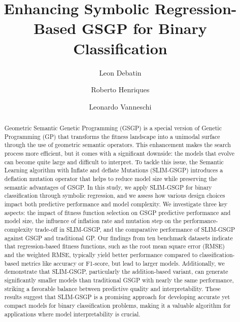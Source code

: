 \documentclass[manuscript, review, anonymous]{acmart} %
\begin{document}
\title{Enhancing Symbolic Regression-Based GSGP for Binary Classification}

\author{Leon Debatin}

\author{Roberto Henriques}

\author{Leonardo Vanneschi}

\renewcommand{\shortauthors}{Debatin et al.}

\begin{abstract}
Geometric Semantic Genetic Programming (GSGP) is a 
special version of Genetic Programming (GP) that transforms 
the fitness landscape into a unimodal surface through 
the use of geometric semantic operators. 
This enhancement makes the search process more efficient, 
but it comes with a significant downside: the models that evolve can become quite large and difficult to interpret. 
To tackle this issue, the Semantic Learning algorithm with Inﬂate and deﬂate Mutations (SLIM-GSGP) introduces 
a deflation mutation operator that helps to reduce model size 
while preserving the semantic advantages of GSGP. 
In this study, we apply SLIM-GSGP for binary classification through symbolic regression, and we assess how various design 
choices impact both predictive performance and model complexity. We investigate three key aspects: 
the impact of fitness function selection on GSGP predictive performance and model size, 
the influence of inflation rate and mutation step on the performance-complexity trade-off in SLIM-GSGP, 
and the comparative performance of SLIM-GSGP against GSGP and traditional GP.
Our findings from ten benchmark datasets indicate that regression-based fitness functions, 
such as the root mean square error (RMSE) and the weighted RMSE, typically yield better performance compared to 
classification-based metrics like accuracy or F1-score, but lead to larger models. 
Additionally, we demonstrate that SLIM-GSGP, particularly the addition-based variant, can 
generate significantly smaller models than traditional GSGP with nearly the same performance, 
striking a favorable balance between predictive quality and interpretability. 
These results suggest that SLIM-GSGP is a promising approach for developing 
accurate yet compact models for binary classification problems, making 
it a valuable algorithm for applications where model interpretability is crucial.
\end{abstract}
\end{document}
